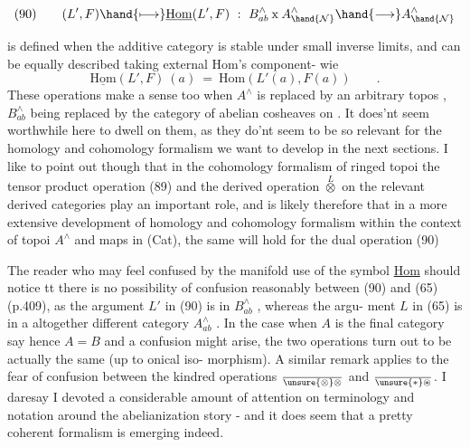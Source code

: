
\[ (90)\qquad (L',F)\hand{\longmapsto}\underline{\mathrm{Hom}}(L',F) \ :\ B^{\wedge}_{ab} \mathbin{\mathrm{x}} A^{\wedge}_{\hand{\mathcal{N}}} \hand{\longrightarrow} A^{\wedge}_{\hand{\mathcal{N}}} \]

is defined when the additive category  is stable under small inverse
limits, and can be equally described  taking external Hom's component-%
wie
\[ \underline{\mathrm{Hom}}(L',F)\ (a) \ = \ \mathrm{Hom}(L'(a),F(a)) \qquad . \]
These operations make a sense too when $A^{\wedge}$ is replaced by an arbitrary topos
 , $B^{\wedge}_{ab}$ being replaced by the category of abelian cosheaves on . It
does'nt seem worthwhile here to dwell on them, as they do'nt seem to be
so relevant for the homology and cohomology formalism we want to develop
in the next sections. I like to point out though that in the cohomology
formalism of ringed topoi the tensor product operation (89) and the 
derived operation $\overset{L}{\otimes}$ on the relevant derived categories  play an important
role, and  is likely therefore that in a more extensive development of
homology and cohomology formalism within the context of topoi $A^{\wedge}$ and maps
 in (Cat), the same will hold for the dual operation (90)  

The reader
who may feel confused by the manifold use of the symbol \uline{Hom} should notice
tt there is no possibility of confusion reasonably between (90) and
(65) (p.409), as the argument $L'$ in (90) is in $B^{\wedge}_{ab}$ , whereas the argu-%
ment $L$ in (65) is in a altogether different category $A^{\wedge}_{ab}$ . In the case
when $A$ is the final category say hence $A=B$ and a confusion might arise,
the two operations turn out to be actually the same (up to onical iso-%
morphism). A similar remark applies to the fear of confusion between the
kindred operations $\over{\unsure{\otimes}}{\otimes}$ and $\over{\unsure{*}}{\circledast}$. I daresay I devoted a considerable
amount of attention on terminology and notation around the abelianization
story - and it does seem that a pretty coherent formalism is emerging
indeed.

